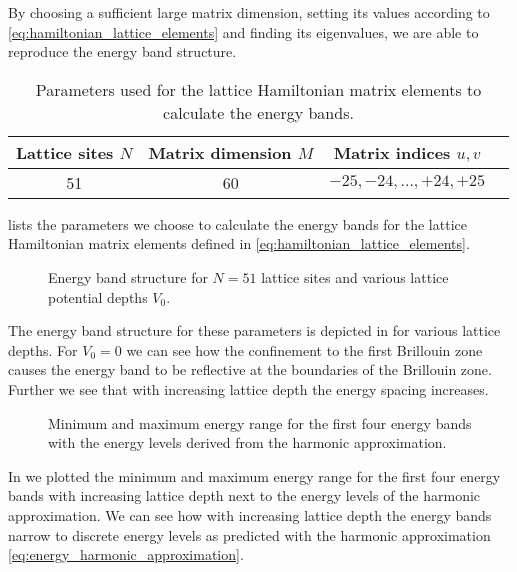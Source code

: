By choosing a sufficient large matrix dimension, setting its values according
to \cref{eq:hamiltonian_lattice_elements} and finding its eigenvalues, we
are able to reproduce the energy band structure.
\begin{table}[htb]
  \centering
  \begin{tabular}{cccc}
    \toprule
    Lattice sites $N$ & Matrix dimension $M$ & Matrix indices $u,v$ \\
    \midrule
    \num{51} & \num{60} & $-25,-24,\dots,+24,+25$ \\
    \bottomrule
  \end{tabular}
  \caption{Parameters used for the lattice Hamiltonian matrix elements to
    calculate the energy bands.
  }\label{tab:hamiltonian_elements}
\end{table}
 lists the parameters we choose to calculate
the energy bands for the lattice Hamiltonian matrix elements defined in
\cref{eq:hamiltonian_lattice_elements}.
\begin{figure}[htb]
  \centering
  \begin{adjustbox}{width=\textwidth}
    
  \end{adjustbox}
  \caption{Energy band structure for $N=51$ lattice sites and various lattice
    potential depths $V_0$.
  }\label{fig:scale_energy_structure}
\end{figure}
The energy band structure for these parameters is depicted in
 for various lattice depths. For $V_0=0$ we
can see how the confinement to the first Brillouin zone causes the energy band
to be reflective at the boundaries of the Brillouin zone. Further we see that
with increasing lattice depth the energy spacing increases.
\begin{figure}[htb]
  \centering
  \begin{adjustbox}{width=\textwidth}
    
  \end{adjustbox}
  \caption{Minimum and maximum energy range for the first four energy bands
    with the energy levels derived from the harmonic approximation.
  }\label{fig:scale_energy}
\end{figure}
In  we plotted the minimum and maximum energy range
for the first four energy bands with increasing lattice depth next to the
energy levels of the harmonic approximation. We can see how with increasing
lattice depth the energy bands narrow to discrete energy levels as predicted
with the harmonic approximation \cref{eq:energy_harmonic_approximation}.

